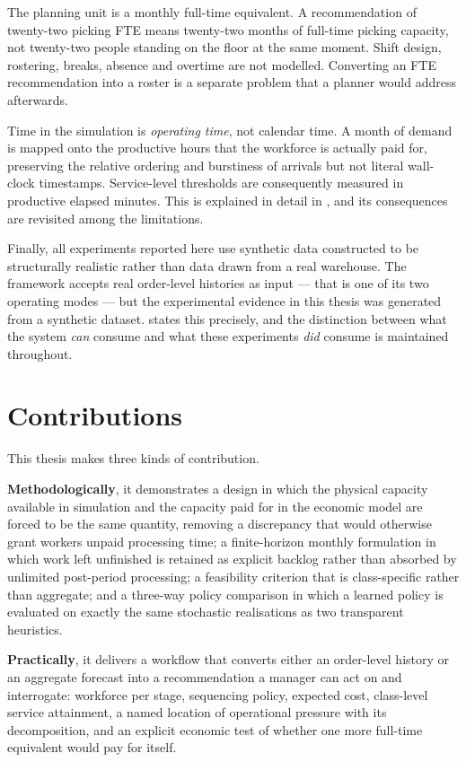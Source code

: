 The planning unit is a monthly full-time equivalent. A recommendation of twenty-two picking
FTE means twenty-two months of full-time picking capacity, not twenty-two people standing on
the floor at the same moment. Shift design, rostering, breaks, absence and overtime are not
modelled. Converting an FTE recommendation into a roster is a separate problem that a planner
would address afterwards.

Time in the simulation is \emph{operating time}, not calendar time. A month of demand is mapped
onto the productive hours that the workforce is actually paid for, preserving the relative
ordering and burstiness of arrivals but not literal wall-clock timestamps. Service-level
thresholds are consequently measured in productive elapsed minutes. This is explained in detail
in , and its consequences are revisited among the limitations.

Finally, all experiments reported here use synthetic data constructed to be structurally
realistic rather than data drawn from a real warehouse. The framework accepts real order-level
histories as input --- that is one of its two operating modes --- but the experimental evidence
in this thesis was generated from a synthetic dataset.  states this
precisely, and the distinction between what the system \emph{can} consume and what these
experiments \emph{did} consume is maintained throughout.

\section{Contributions}
\label{sec:contributions}

This thesis makes three kinds of contribution.

\textbf{Methodologically}, it demonstrates a design in which the physical capacity available in
simulation and the capacity paid for in the economic model are forced to be the same quantity,
removing a discrepancy that would otherwise grant workers unpaid processing time; a
finite-horizon monthly formulation in which work left unfinished is retained as explicit
backlog rather than absorbed by unlimited post-period processing; a feasibility criterion that
is class-specific rather than aggregate; and a three-way policy comparison in which a learned
policy is evaluated on exactly the same stochastic realisations as two transparent heuristics.

\textbf{Practically}, it delivers a workflow that converts either an order-level history or an
aggregate forecast into a recommendation a manager can act on and interrogate: workforce per
stage, sequencing policy, expected cost, class-level service attainment, a named location of
operational pressure with its decomposition, and an explicit economic test of whether one more
full-time equivalent would pay for itself.


